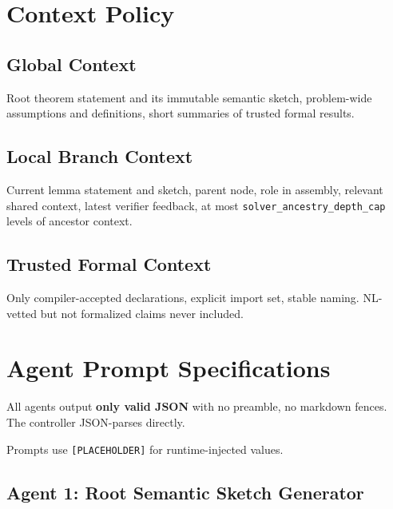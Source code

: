 \documentclass[11pt,a4paper]{article}
\begin{document}
\section{Context Policy}

\subsection{Global Context}
Root theorem statement and its immutable semantic sketch, problem-wide assumptions and definitions, short summaries of trusted formal results.

\subsection{Local Branch Context}
Current lemma statement and sketch, parent node, role in assembly, relevant shared context, latest verifier feedback, at most \texttt{solver\_ancestry\_depth\_cap} levels of ancestor context.

\subsection{Trusted Formal Context}
Only compiler-accepted declarations, explicit import set, stable naming. NL-vetted but not formalized claims never included.

\section{Agent Prompt Specifications}
\label{sec:prompts}

All agents output \textbf{only valid JSON} with no preamble, no markdown fences. The controller JSON-parses directly.

Prompts use \texttt{[PLACEHOLDER]} for runtime-injected values.

\subsection{Agent 1: Root Semantic Sketch Generator}
\end{document}
